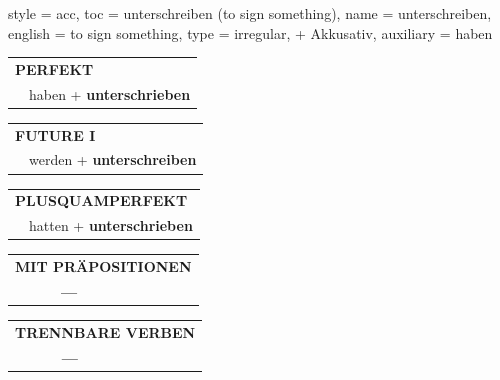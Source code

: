 \begin{verbentry}{
  style = {acc},
  toc = {unterschreiben (to sign something)},
  name = {unterschreiben},
  english = {to sign something},
  type = {irregular, + Akkusativ},
  auxiliary = {haben}
}
 \begin{tabular}{rl}
     \multicolumn{2}{l}{\textbf{PERFEKT}}\\
   & haben + \textbf{unterschrieben}\\
  \end{tabular}
\hfill
   \begin{tabular}{rl}
   
    \multicolumn{2}{l}{\textbf{FUTURE I} }\\
   & werden + \textbf{unterschreiben}\\
 
  \end{tabular}
\hfill
   \begin{tabular}{rl}
      \multicolumn{2}{l}{\textbf{PLUSQUAMPERFEKT}}\\
   & hatten + \textbf{unterschrieben}\\
  \end{tabular}
  
  
\vspace{10pt}

\begin{tabular}{lll}
\multicolumn{3}{l}{\textbf{MIT PRÄPOSITIONEN}}\\
& \textbf{---} & \\
\end{tabular}
\hfill
\begin{tabular}{lll}
\multicolumn{3}{l}{\textbf{TRENNBARE VERBEN}}\\
& \textbf{---} & \\
\end{tabular}
\vspace{-5pt}
\end{verbentry}

